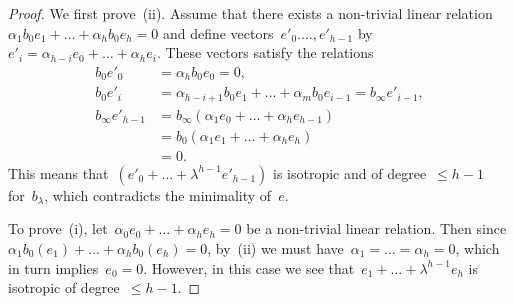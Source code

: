 \documentclass{lms}%
\begin{document}
\begin{proof}
We first prove~(ii). Assume that there exists a non-trivial linear
relation~$α_1 b_0 e_1 + … + α_h b_0 e_{h} = 0$ and define
vectors~$e'_0.…,e'_{h-1}$ by $e'_i = α_{h-i} e_0 + … + α_{h} e_i$. These
vectors satisfy the relations
\begin{equation}\label{eq:relation-e'}
\begin{split}
b_0 e'_0 &= α_h b_0 e_0 = 0, \\
b_0 e'_i &= α_{h-i+1} b_0 e_1 + … + α_m b_0 e_{i-1} = b_{∞} e'_{i-1}, \\
b_{∞} e'_{h-1} &= b_{∞} (α_1 e_{0} + … + α_{h} e_{h-1}) \\
 &= b_{0} (α_1 e_{1} + … + α_{h} e_{h}) \\
 &= 0.
\end{split}
\end{equation}
This means that~$(e'_0+…+λ^{h-1} e'_{h-1})$ is isotropic and of degree~$≤
h-1$ for~$b_{λ}$, which contradicts the minimality of~$e$.

To prove~(i), let~$α_0 e_0 + … + α_h e_h = 0$ be a non-trivial linear
relation. Then since $α_1 b_0(e_1) + … + α_h b_0(e_h) = 0$, by~(ii) we
must have~$α_1 = … = α_h = 0$, which in turn implies~$e_0 = 0$. However,
in this case we see that~$e_1+…+ λ^{h-1} e_h$ is isotropic of degree~$≤
h-1$.

\end{proof}
\end{document}
